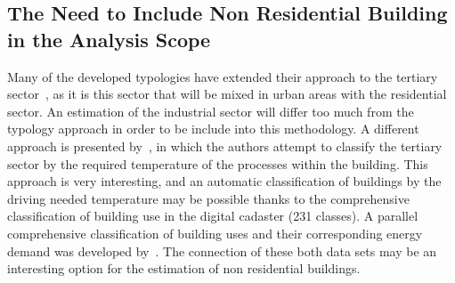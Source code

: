 \documentclass[authoryear,preprint,review,12pt]{elsarticle}
\begin{document}
\begin{linenumbers}
%

\subsection{The Need to Include Non Residential Building in the Analysis Scope}\label{sub-section:NR}

Many of the developed typologies have extended their approach to the tertiary
sector~\cite{Loga.2011, Hermelink.2011}, as it is this sector that will be
mixed in urban areas with the residential sector. An estimation of the
industrial sector will differ too much from the typology approach in order to be
include into this methodology. A different approach is presented
by~\cite{Blesl.2007}, in which the authors attempt to classify the tertiary
sector by the required temperature of the processes within the building.  This
approach is very interesting, and an automatic classification of buildings by
the driving needed temperature may be possible thanks to the comprehensive
classification of building use in the digital cadaster (231 classes).  A
parallel comprehensive classification of building uses and their corresponding
energy demand was developed by~\cite{Zeine.2007}.  The connection of these both
data sets may be an interesting option for the estimation of non residential
buildings.\\


\end{linenumbers}
\end{document}
